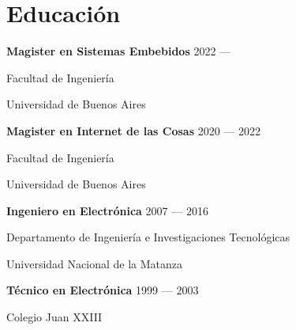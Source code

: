 \section{Educación}
\parbox[t][][t]{\linewidth}{
	\parbox{\linewidth}{\textbf{Magister en Sistemas Embebidos} \hfill {{2022 --- \phantom{2023}}}}
	\parbox{\linewidth}{{Facultad de Ingeniería}}
	\parbox{\linewidth}{{Universidad de Buenos Aires}}
	\smallskip
	\smallskip
}

\parbox[t][][t]{\linewidth}{
	\parbox{\linewidth}{\textbf{Magister en Internet de las Cosas} \hfill {{2020 --- 2022}}}
	\parbox{\linewidth}{{Facultad de Ingeniería}}
	\parbox{\linewidth}{{Universidad de Buenos Aires}}
	\smallskip
	\smallskip
}

\parbox[t][][t]{\linewidth}{
	\parbox{\linewidth}{\textbf{Ingeniero en Electrónica} \hfill {{2007 --- 2016}}}
	\parbox{\linewidth}{{Departamento de Ingeniería e Investigaciones Tecnológicas}}
	\parbox{\linewidth}{{Universidad Nacional de la Matanza}}
	\smallskip
	\smallskip
}

\parbox[t][][t]{\linewidth}{
	\parbox{\linewidth}{\textbf{Técnico en Electrónica} \hfill {{1999 --- 2003}}}
	\parbox{\linewidth}{{Colegio Juan XXIII}}
	\smallskip
	\smallskip
}

